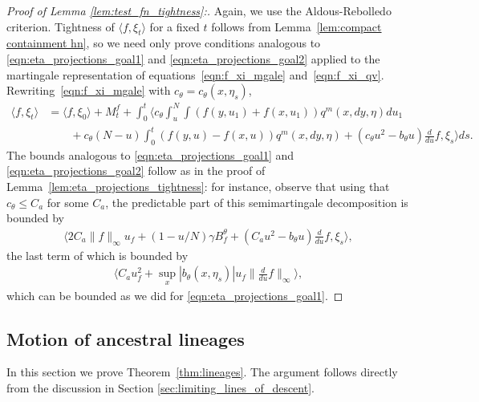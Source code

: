 \documentclass[EJP]{ejpecp} %
\newcommand{\lp}{\xi}              %
\begin{document}
\begin{proof}[Proof of Lemma \ref{lem:test_fn_tightness}:]
    Again, we use the Aldous-Rebolledo criterion.
    Tightness of $\langle f, \lp_t \rangle$ for a fixed $t$
    follows from Lemma~\ref{lem:compact containment hn},
    so we need only prove conditions analogous to
    \eqref{eqn:eta_projections_goal1}
    and \eqref{eqn:eta_projections_goal2}
    applied to the martingale representation
    of equations~\eqref{eqn:f_xi_mgale} and~\eqref{eqn:f_xi_qv}.
    Rewriting~\eqref{eqn:f_xi_mgale} with $c_\theta = c_\theta(x, \eta_s)$,
    \begin{align*}
        \langle f, \lp_t \rangle
        &=
        \langle f, \lp_0 \rangle
        + M^f_t
        + \int_0^t \Big\langle
            c_\theta \int_u^N \int (f(y, u_1) + f(x, u_1)) q^m(x,dy,\eta) du_1
        \\ {} &\qquad
            + c_\theta (N - u) \int_0^t (f(y, u) - f(x, u)) q^m(x,dy,\eta)
            + (c_\theta u^2 - b_\theta u) \frac{d}{du} f,
            \lp_s
        \Big\rangle ds .
    \end{align*}
    The bounds analogous to \eqref{eqn:eta_projections_goal1} and \eqref{eqn:eta_projections_goal2}
    follow as in the proof of Lemma~\ref{lem:eta_projections_tightness}:
    for instance, observe that using that $c_\theta \le C_a$ for some $C_a$,
    the predictable part of this semimartingale decomposition is bounded by
    \begin{align*}
        \Big\langle
            2 C_a \|f\|_\infty u_f
            + (1 - u/N) \gamma B^\theta_f
            + (C_a u^2 - b_\theta u) \frac{d}{du} f,
            \lp_s
        \Big\rangle ,
    \end{align*}
    the last term of which is bounded by
    \begin{align*}
        \langle
            C_a u_f^2 + \sup_x |b_\theta(x, \eta_s)| u_f \|\frac{d}{du} f\|_\infty
        \rangle ,
    \end{align*}
    which can be bounded as we did for \eqref{eqn:eta_projections_goal1}.
\end{proof}

\subsection{Motion of ancestral lineages}
\label{sec:lineages_proof}

In this section we prove Theorem~\ref{thm:lineages}.
The argument follows directly from the discussion in Section \ref{sec:limiting_lines_of_descent}.
\end{document}
